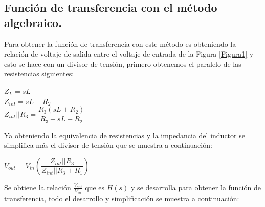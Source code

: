 \documentclass[12pt,a4paper]{article}
\newcounter{ns}
\begin{document}
\newpage
\subsection{Función de transferencia con el método algebraico.}
Para obtener la función de transferencia con este método es obteniendo la relación de voltaje de salida entre el voltaje de entrada de la Figura \ref{Figura1} y esto se hace con un divisor de tensión, primero obtenemos el paralelo de las resistencias siguientes:\\
\begin{center}
$Z_{L} = sL$\\[12pt]
$Z_{int} = sL + R_{2}$\\[12pt]
$Z_{int}||R_{3}= \dfrac{R_{3}(sL + R_{2})}{R_{3}+sL+R_{2}}$
\end{center}
Ya obteniendo la equivalencia de resistencias y la impedancia del inductor se simplifica más el divisor de tensión que se muestra a continuación:\\
\begin{center}
$V_{out}=V_{in}\left(\dfrac{Z_{int}||R_{3}}{Z_{int}||R_{3} + R_{1}}\right)$
\end{center}
Se obtiene la relación $\frac{V_{out}}{V_{in}}$ que es $H(s)$ y se desarrolla para obtener la función de transferencia, todo el desarrollo y simplificación se muestra a continuación:\\
\end{document}
